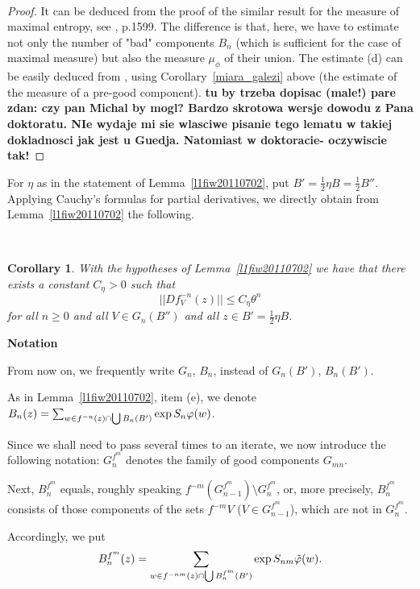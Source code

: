 \documentclass[12pt]{amsart}
\numberwithin{equation}{section}
\newcommand{\bcor}{\begin{cor}}
\newcommand{\ecor}{\end{cor}}
\newtheorem{cor}[thm]{Corollary}
\begin{document}
\
\begin{proof} It can be deduced from  the  proof of  the similar result for the measure of maximal entropy, see \cite{gue}, p.1599.
The difference is that, here, we have to estimate not only the number of "bad" components $B_n$ (which is sufficient for the case of maximal measure) but also the measure $\mu_\phi$ of their union. The estimate (d) can be easily deduced from  \cite{gue}, using Corollary~\ref{miara_galezi} above (the estimate of the measure of a pre-good component).
{\bf tu by trzeba dopisac (male!) pare  zdan: czy pan Michal by mogl? Bardzo skrotowa wersje dowodu z Pana doktoratu. NIe wydaje mi sie wlasciwe pisanie tego lematu w takiej dokladnosci jak jest u Guedja. Natomiast w doktoracie- oczywiscie tak!}

\end{proof}


\fr  For $\eta$ as in the statement of Lemma~\ref{l1fiw20110702}, put $B'=\frac{1}{2}\eta B=\frac{1}{2}B''$. Applying Cauchy's formulas for partial derivatives, we directly
obtain from Lemma~\ref{l1fiw20110702} the following.

\

\bcor\label{c120110706}
With the hypotheses of Lemma~\ref{l1fiw20110702} we have that there
exists a constant $C_\eta>0$ such that
$$
||Df_V^{-n}(z)||\le C_\eta\theta^n
$$
for all $n\ge 0$ and all $V\in G_n(B'')$ and all $z\in B'=\frac{1}{2}\eta B$.
\ecor

{\bf Notation}

From now on, we frequently write $G_n$, $B_n$, instead of $G_n(B')$, $B_n(B')$.

As in  Lemma~\ref{l1fiw20110702}, item (e), we denote   $B_n(z)=\sum_{w\in f^{-n}(z)\cap \bigcup B_n(B')}\exp S_n\varphi(w)$.

Since we shall need to pass several times to an iterate, we now introduce the following notation:
$G^{f^m}_n$ denotes the family of good components $G_{mn}$. 

Next, $B^{f^m}_n$ equals, roughly speaking $f^{-m}(G^{f^m}_{n-1})\setminus G^{f^m}_n$, or, more precisely,
 $B^{f^m}_n$ consists of those components of the sets $f^{-m}V$ ($V\in G^{f^m}_{n-1}$), which are not in $G^{f^m}_n$.

Accordingly, we put
$$B_n^{f^m}(z)=\sum_{w\in f^{-nm}(z)\cap \bigcup B_n^{f^m}(B')}\exp S_{nm}\tilde\varphi(w).$$
 \
  
\end{document}

